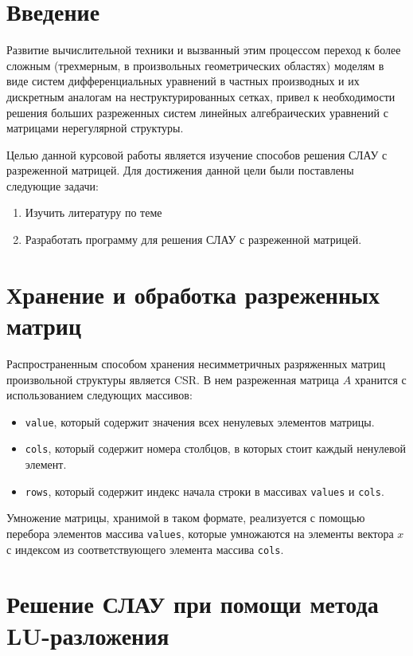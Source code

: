\documentclass[a4paper, fontsize=14pt]{article}
\begin{document}
\tableofcontents

\thispagestyle{empty}
\newpage

\section*{Введение}

Развитие вычислительной техники и вызванный этим процессом переход к более сложным (трехмерным, 
в произвольных геометрических областях) моделям в виде систем дифференциальных уравнений в 
частных производных и их дискретным аналогам на неструктурированных сетках, привел к 
необходимости решения больших разреженных систем линейных алгебраических уравнений с 
матрицами нерегулярной структуры.

Целью данной курсовой работы является изучение способов решения СЛАУ с разреженной матрицей.
Для достижения данной цели были поставлены следующие задачи:
\begin{enumerate}
    \item Изучить литературу по теме
    \item Разработать программу для решения СЛАУ с разреженной матрицей.
\end{enumerate}
\newpage
\section{Хранение и обработка разреженных матриц}
Распространенным способом хранения несимметричных разряженных матриц произвольной структуры является
CSR. В нем разреженная матрица $A$ хранится с использованием следующих массивов:
\begin{itemize}
    \item \verb|value|, который содержит значения всех ненулевых элементов матрицы.
    \item \verb|cols|, который содержит номера столбцов, в которых стоит каждый ненулевой элемент.
    \item \verb|rows|, который содержит индекс начала строки в массивах \verb|values| и \verb|cols|.
\end{itemize}
Умножение матрицы, хранимой в таком формате, реализуется с помощью перебора элементов массива
\verb|values|, которые умножаются на элементы вектора $x$ с индексом из соответствующего
элемента массива \verb|cols|. 

\section{Решение СЛАУ при помощи метода LU-разложения}
\end{document}

